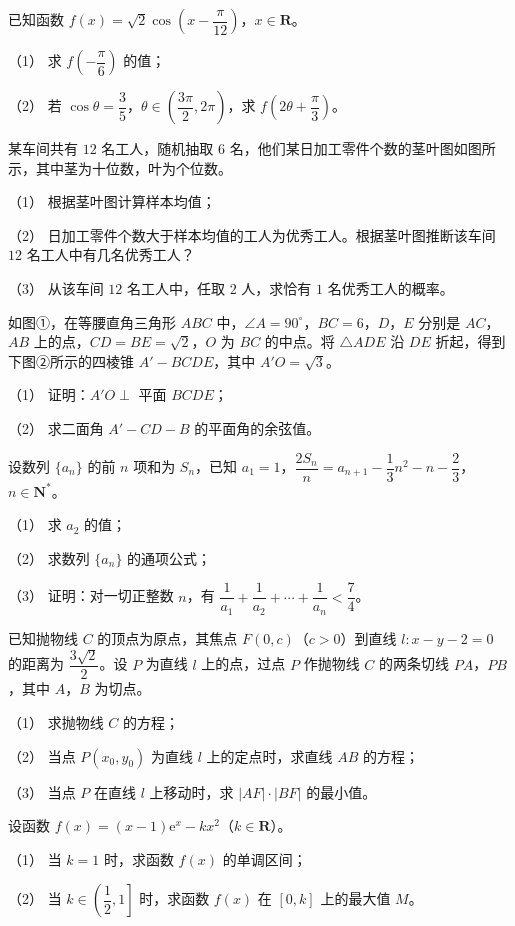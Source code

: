 \begin{question}
已知函数 $f(x)=\sqrt2\cos\left(x-\dfrac{\pi}{12}\right)$，$x\in\mathbf R$。

（1） 求 $f\left(-\dfrac{\pi}{6}\right)$ 的值；

（2） 若 $\cos\theta=\dfrac35$，$\theta\in\left(\dfrac{3\pi}{2},2\pi\right)$，求 $f\left(2\theta+\dfrac{\pi}{3}\right)$。

\Needspace{0.4\textheight}
\end{question}
\begin{question}
某车间共有 $12$ 名工人，随机抽取 $6$ 名，他们某日加工零件个数的茎叶图如图所示，其中茎为十位数，叶为个位数。
\nopagebreak[4]
\begin{center}\end{center}
\nopagebreak[4]
（1） 根据茎叶图计算样本均值；

（2） 日加工零件个数大于样本均值的工人为优秀工人。根据茎叶图推断该车间 $12$ 名工人中有几名优秀工人？

（3） 从该车间 $12$ 名工人中，任取 $2$ 人，求恰有 $1$ 名优秀工人的概率。

\Needspace{0.4\textheight}
\end{question}
\begin{question}
如图①，在等腰直角三角形 $ABC$ 中，$\angle A=90^\circ$，$BC=6$，$D$，$E$ 分别是 $AC$，$AB$ 上的点，$CD=BE=\sqrt2$，$O$ 为 $BC$ 的中点。将 $\triangle ADE$ 沿 $DE$ 折起，得到下图②所示的四棱锥 $A'-BCDE$，其中 $A'O=\sqrt3$。
\nopagebreak[4]
\begin{center}\end{center}
\nopagebreak[4]
（1） 证明：$A'O\perp$ 平面 $BCDE$；

（2） 求二面角 $A'-CD-B$ 的平面角的余弦值。

\end{question}
\begin{question}
设数列 $\{a_n\}$ 的前 $n$ 项和为 $S_n$，已知 $a_1=1$，$\dfrac{2S_n}{n}=a_{n+1}-\dfrac13n^2-n-\dfrac23$，$n\in\mathbf N^*$。

（1） 求 $a_2$ 的值；

（2） 求数列 $\{a_n\}$ 的通项公式；

（3） 证明：对一切正整数 $n$，有 $\dfrac1{a_1}+\dfrac1{a_2}+\cdots+\dfrac1{a_n}<\dfrac74$。

\end{question}
\begin{question}
已知抛物线 $C$ 的顶点为原点，其焦点 $F(0,c)$（$c>0$）到直线 $l:x-y-2=0$ 的距离为 $\dfrac{3\sqrt2}{2}$。设 $P$ 为直线 $l$ 上的点，过点 $P$ 作抛物线 $C$ 的两条切线 $PA$，$PB$，其中 $A$，$B$ 为切点。

（1） 求抛物线 $C$ 的方程；

（2） 当点 $P(x_0,y_0)$ 为直线 $l$ 上的定点时，求直线 $AB$ 的方程；

（3） 当点 $P$ 在直线 $l$ 上移动时，求 $|AF|\cdot|BF|$ 的最小值。

\end{question}
\begin{question}
设函数 $f(x)=(x-1)\mathrm e^x-kx^2$（$k\in\mathbf R$）。

（1） 当 $k=1$ 时，求函数 $f(x)$ 的单调区间；

（2） 当 $k\in\left(\dfrac12,1\right]$ 时，求函数 $f(x)$ 在 $[0,k]$ 上的最大值 $M$。

\end{question}